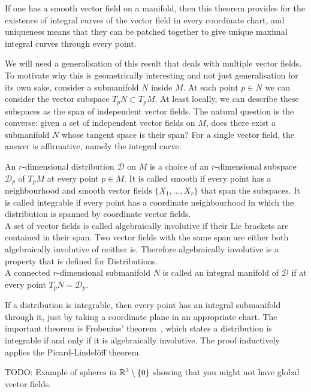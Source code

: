 If one has a smooth vector field on a manifold, then this theorem provides for the existence of integral curves of the vector field in every coordinate chart, and uniqueness means that they can be patched together to give unique maximal integral curves through every point.

We will need a generalisation of this result that deals with multiple vector fields.
To motivate why this is geometrically interesting and not just generalisation for its own sake, consider a submanifold $N$ inside $M$.
At each point $p \in N$ we can consider the vector subspace $T_pN \subset T_pM$.
At least locally, we can describe these subspaces as the span of independent vector fields.
The natural question is the converse: given a set of independent vector fields on $M$, does there exist a submanifold $N$ whose tangent space is their span?
For a single vector field, the answer is affirmative, namely the integral curve.

\begin{definition}
An $r$-dimensional distribution $\mathcal{D}$ on $M$ is a choice of an $r$-dimensional subspace $\mathcal{D}_p$ of $T_p M$ at every point $p \in M$.
It is called smooth if every point has a neighbourhood and smooth vector fields $\{X_1, \dots, X_r \}$ that span the subspaces. 
It is called integrable if every point has a coordinate neighbourhood in which the distribution is spanned by coordinate vector fields.
\\
A set of vector fields is called algebraically involutive if their Lie brackets are contained in their span.
Two vector fields with the same span are either both algebraically involutive of neither is.
Therefore algebraically involutive is a property that is defined for Distributions.\\
A connected $r$-dimensional submanifold $N$ is called an integral manifold of $\mathcal{D}$ if at every point $T_pN = \mathcal{D}_p$.
\\\textup{\cite[2.2.1,.2.2.2,2.3.2]{Sharpe1997}}
\end{definition}

If a distribution is integrable, then every point has an integral submanifold through it, just by taking a coordinate plane in an appropriate chart.
The important theorem is Frobenius' theorem~\cite[2.4.1]{Sharpe1997}, which states a distribution is integrable if and only if it is algebraically involutive.
The proof inductively applies the Picard-Lindelöff theorem.

TODO: Example of spheres in $\mathbb{R}^3\setminus\{0\}$ showing that you might not have global vector fields.


